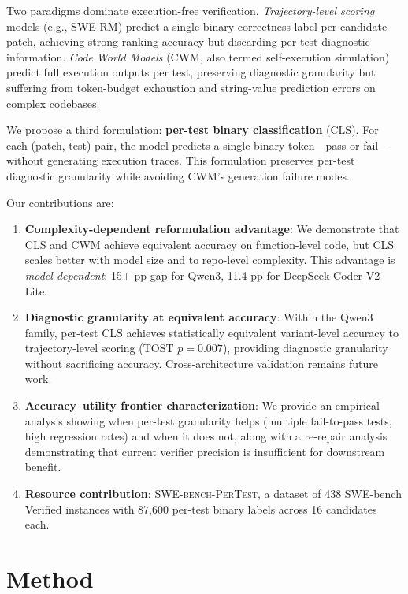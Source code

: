 \documentclass[11pt]{article}
\begin{document}
Two paradigms dominate execution-free verification. \emph{Trajectory-level scoring} models (e.g., SWE-RM) predict a single binary correctness label per candidate patch, achieving strong ranking accuracy but discarding per-test diagnostic information. \emph{Code World Models} (CWM, also termed self-execution simulation) predict full execution outputs per test, preserving diagnostic granularity but suffering from token-budget exhaustion and string-value prediction errors on complex codebases.

We propose a third formulation: \textbf{per-test binary classification} (CLS). For each (patch, test) pair, the model predicts a single binary token---pass or fail---without generating execution traces. This formulation preserves per-test diagnostic granularity while avoiding CWM's generation failure modes.

Our contributions are:
\begin{enumerate}
    \item \textbf{Complexity-dependent reformulation advantage}: We demonstrate that CLS and CWM achieve equivalent accuracy on function-level code, but CLS scales better with model size and to repo-level complexity. This advantage is \emph{model-dependent}: 15+ pp gap for Qwen3, 11.4 pp for DeepSeek-Coder-V2-Lite.
    \item \textbf{Diagnostic granularity at equivalent accuracy}: Within the Qwen3 family, per-test CLS achieves statistically equivalent variant-level accuracy to trajectory-level scoring (TOST $p=0.007$), providing diagnostic granularity without sacrificing accuracy. Cross-architecture validation remains future work.
    \item \textbf{Accuracy--utility frontier characterization}: We provide an empirical analysis showing when per-test granularity helps (multiple fail-to-pass tests, high regression rates) and when it does not, along with a re-repair analysis demonstrating that current verifier precision is insufficient for downstream benefit.
    \item \textbf{Resource contribution}: \textsc{SWE-bench-PerTest}, a dataset of 438 SWE-bench Verified instances with 87,600 per-test binary labels across 16 candidates each.
\end{enumerate}

\section{Method}
\label{sec:method}
\end{document}
